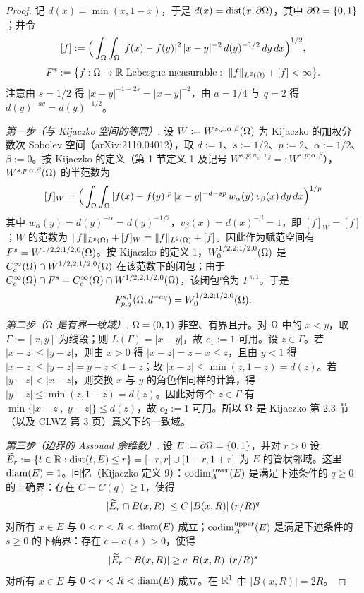 \begin{proof}
记 $d(x)=\min(x,1-x)$，于是 $d(x)=\operatorname{dist}(x,\partial\Omega)$，其中 $\partial\Omega=\{0,1\}$；并令
\[
  [f]:=\Big(\int_\Omega\int_\Omega|f(x)-f(y)|^2\,|x-y|^{-2}\,d(y)^{-1/2}\,dy\,dx\Big)^{1/2},
\]
\[
  F^s:=\big\{f:\Omega\to\mathbb{R}\ \text{Lebesgue measurable}:\ \|f\|_{L^2(\Omega)}+[f]<\infty\big\}.
\]
注意由 $s=1/2$ 得 $|x-y|^{-1-2s}=|x-y|^{-2}$，由 $a=1/4$ 与 $q=2$ 得 $d(y)^{-aq}=d(y)^{-1/2}$。

\emph{第一步（与 Kijaczko 空间的等同）}. 设 $W:=W^{s,p;\alpha,\beta}(\Omega)$ 为 Kijaczko 的加权分数次 Sobolev 空间（arXiv:2110.04012），取 $d:=1$、$s:=1/2$、$p:=2$、$\alpha:=1/2$、$\beta:=0$。按 Kijaczko 的定义（第 1 节定义 1 及记号 $W^{s,p;w_\alpha,v_\beta}=:W^{s,p;\alpha,\beta}$），$W^{s,p;\alpha,\beta}(\Omega)$ 的半范数为
\[
  [f]_{W}=\Big(\int_\Omega\int_\Omega|f(x)-f(y)|^p\,|x-y|^{-d-sp}\,w_\alpha(y)\,v_\beta(x)\,dy\,dx\Big)^{1/p}
\]
其中 $w_\alpha(y)=d(y)^{-\alpha}=d(y)^{-1/2}$，$v_\beta(x)=d(x)^{-\beta}=1$，即 $[f]_{W}=[f]$；$W$ 的范数为 $\|f\|_{L^p(\Omega)}+[f]_{W}=\|f\|_{L^2(\Omega)}+[f]$。因此作为赋范空间有 $F^s=W^{1/2,2;1/2,0}(\Omega)$。按 Kijaczko 的定义 1，$W_0^{1/2,2;1/2,0}(\Omega)$ 是 $C_c^\infty(\Omega)\cap W^{1/2,2;1/2,0}(\Omega)$ 在该范数下的闭包；由于 $C_c^\infty(\Omega)\cap F^s=C_c^\infty(\Omega)\cap W^{1/2,2;1/2,0}(\Omega)$，该闭包恰为 $F^{s,1}$。于是
\begin{equation}\label{eq:sec5f1-ident}
  F^{s,1}_{p,q}(\Omega,d^{-aq})=W_0^{1/2,2;1/2,0}(\Omega).
\end{equation}

\emph{第二步（$\Omega$ 是有界一致域）}. $\Omega=(0,1)$ 非空、有界且开。对 $\Omega$ 中的 $x<y$，取 $\Gamma:=[x,y]$ 为线段；则 $L(\Gamma)=|x-y|$，故 $c_1:=1$ 可用。设 $z\in\Gamma$。若 $|x-z|\le|y-z|$，则由 $x>0$ 得 $|x-z|=z-x\le z$，且由 $y<1$ 得 $|x-z|\le|y-z|=y-z\le1-z$；故 $|x-z|\le\min(z,1-z)=d(z)$。若 $|y-z|<|x-z|$，则交换 $x$ 与 $y$ 的角色作同样的计算，得 $|y-z|\le\min(z,1-z)=d(z)$。因此对每个 $z\in\Gamma$ 有 $\min\{|x-z|,|y-z|\}\le d(z)$，故 $c_2:=1$ 可用。所以 $\Omega$ 是 Kijaczko 第 2.3 节（以及 CLWZ 第 3 页）意义下的一致域。

\emph{第三步（边界的 Assouad 余维数）}. 设 $E:=\partial\Omega=\{0,1\}$，并对 $r>0$ 设 $\widetilde E_r:=\{t\in\mathbb{R}:\operatorname{dist}(t,E)\le r\}=[-r,r]\cup[1-r,1+r]$ 为 $E$ 的管状邻域。这里 $\operatorname{diam}(E)=1$。回忆（Kijaczko 定义 9）：$\operatorname{codim}_{A}^{\mathrm{lower}}(E)$ 是满足下述条件的 $q\ge0$ 的上确界：存在 $C=C(q)\ge1$，使得
\[
  |\widetilde E_r\cap B(x,R)|\le C\,|B(x,R)|\,(r/R)^q
\]
对所有 $x\in E$ 与 $0<r<R<\operatorname{diam}(E)$ 成立；$\operatorname{codim}_{A}^{\mathrm{upper}}(E)$ 是满足下述条件的 $s\ge0$ 的下确界：存在 $c=c(s)>0$，使得
\[
  |\widetilde E_r\cap B(x,R)|\ge c\,|B(x,R)|\,(r/R)^s
\]
对所有 $x\in E$ 与 $0<r<R<\operatorname{diam}(E)$ 成立。在 $\mathbb{R}^1$ 中 $|B(x,R)|=2R$。


\end{proof}
